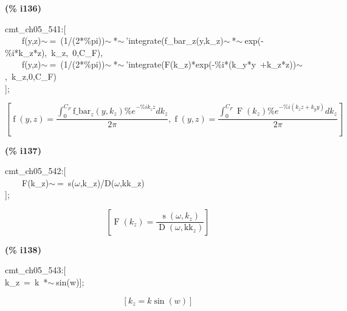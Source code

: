 \documentclass[fleqn]{article}
\begin{document}
\noindent
\begin{minipage}[t]{4.000000em}\color{red}\bfseries
(\% i136)	
\end{minipage}
\begin{minipage}[t]{\textwidth}\color{blue}
cmt\_ch05\_541:[\\
\ \ \ \ f(y,z)\ensuremath{\sim\ }=\ (1/(2*\%pi))\ensuremath{\sim\ }*\ensuremath{\sim\ }'integrate(f\_bar\_z(y,k\_z)\ensuremath{\sim\ }*\ensuremath{\sim\ }exp(-\%i*k\_z*z),\ k\_z,\ 0,C\_F),\\
\ \ \ \ f(y,z)\ensuremath{\sim\ }=\ (1/(2*\%pi))\ensuremath{\sim\ }*\ensuremath{\sim\ }'integrate(F(k\_z)*exp(-\%i*(k\_y*y\ +k\_z*z))\ensuremath{\sim\ },\ k\_z,0,C\_F)\\
];
\end{minipage}
\[\displaystyle \tag{\% o136} 
\left[ \operatorname{f}\left( y\operatorname{,}z\right) =\frac{\int_{0}^{{C_F}}{\left. {{\ensuremath{\mathrm{f\_ bar}}}_z}\left( y\operatorname{,}{k_z}\right)  {{\% e}^{-\% i {k_z} z}}d{k_z}\right.}}{2 \ensuremath{\pi} }\operatorname{,}\operatorname{f}\left( y\operatorname{,}z\right) =\frac{\int_{0}^{{C_F}}{\left. \operatorname{F}\left( {k_z}\right)  {{\% e}^{-\% i \left( {k_z} z+{k_y} y\right) }}d{k_z}\right.}}{2 \ensuremath{\pi} }\right] \mbox{}
\]


\noindent
\begin{minipage}[t]{4.000000em}\color{red}\bfseries
(\% i137)	
\end{minipage}
\begin{minipage}[t]{\textwidth}\color{blue}
cmt\_ch05\_542:[\\
\ \ \ \ F(k\_z)\ensuremath{\sim\ }=\ s(\ensuremath{\omega},k\_z)/D(\ensuremath{\omega},kk\_z)\\
];
\end{minipage}
\[\displaystyle \tag{\% o137} 
\left[ \operatorname{F}\left( {k_z}\right) =\frac{\operatorname{s}\left( \omega \operatorname{,}{k_z}\right) }{\operatorname{D}\left( \omega \operatorname{,}{{\ensuremath{\mathrm{kk}}}_z}\right) }\right] \mbox{}
\]


\noindent
\begin{minipage}[t]{4.000000em}\color{red}\bfseries
(\% i138)	
\end{minipage}
\begin{minipage}[t]{\textwidth}\color{blue}
cmt\_ch05\_543:[\\
k\_z\ =\ k\ *\ensuremath{\sim\ }sin(w)];
\end{minipage}
\[\displaystyle \tag{\% o138} 
\left[ {k_z}=k \sin{(w)}\right] \mbox{}
\]
\end{document}

